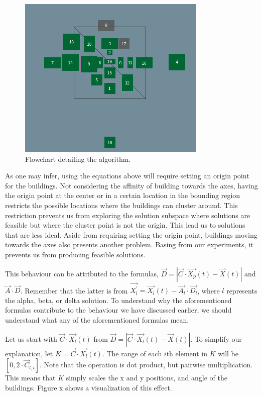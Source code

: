 \begin{figure}[h!]
	\centering
	\includegraphics{./images/chap05-methodology/bad-solution-unmodified-gwo.png}
	\caption{Flowchart detailing the algorithm.}
	\label{bad-solution-unmodified-gwo}
\end{figure}

As one may infer, using the equations above will require setting an origin point for the buildings. Not considering the affinity of building towards the axes, having the origin point at the center or in a certain location in the bounding region restricts the possible locations where the buildings can cluster around. This restriction prevents us from exploring the solution subspace where solutions are feasible but where the cluster point is not the origin. This lead us to solutions that are less ideal. Aside from requiring setting the origin point, buildings moving towards the axes also presents another problem. Basing from our experiments, it prevents us from producing feasible solutions.

This behaviour can be attributed to the formulas, $\vec{D} = \left | \vec{C} \cdot \vec{X_{p}}(t) - \vec{X}(t) \right |$ and $\vec{A} \cdot \vec{D}$. Remember that the latter is from $\vec{X_{l}^{'}} = \vec{X_{l}}(t) - \vec{A_{l}} \cdot \vec{D_{l}}$, where $l$ represents the alpha, beta, or delta solution. To understand why the aforementioned formulas contribute to the behaviour we have discussed earlier, we should understand what any of the aforementioned formulas mean.

Let us start with $\vec{C} \cdot \vec{X_{l}}(t)$ from $\vec{D} = \left | \vec{C} \cdot \vec{X_{l}}(t) - \vec{X}(t) \right |$. To simplify our explanation, let $K = \vec{C} \cdot \vec{X_{l}}(t)$. The range of each $i$th element in $K$ will be $[0, 2 \cdot \vec{C}_{l,i}]$. Note that the operation is dot product, but pairwise multiplication. This means that $K$ simply scales the x and y positions, and angle of the buildings. Figure x shows a visualization of this effect.


